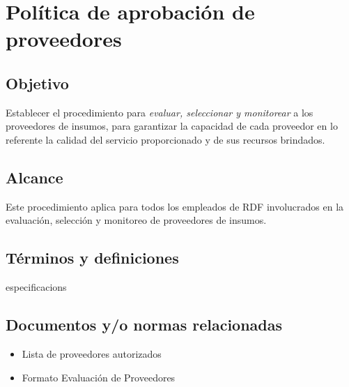 \thispagestyle{formato-PI}
\renewcommand{\MayorVer}{2}
\renewcommand{\MenorVer}{0}
\renewcommand{\FechaPub}{2023--01}
\renewcommand{\TipoID}{POL}
\renewcommand{\Titulo}{Política de aprobación de proveedores}

\section{\Titulo}
\renewcommand{\Codigo}{\Prog--\thesection--\TipoID}

\subsection{Objetivo}

Establecer el procedimiento para \emph{evaluar, seleccionar y monitorear} a los proveedores de insumos, para garantizar la capacidad de cada proveedor en lo referente la calidad del servicio proporcionado y de sus recursos brindados.

\subsection{Alcance}

Este procedimiento aplica para todos los empleados de \gls{RDF} involucrados en la evaluación, selección y monitoreo de proveedores de insumos.

\subsection{Términos y definiciones}
\begin{description}
    \glspl{especificacion}
\end{description}
\subsection{Documentos y/o normas relacionadas}

\begin{itemize}
    \item Lista de proveedores autorizados
    \item Formato Evaluación de Proveedores
\end{itemize}

